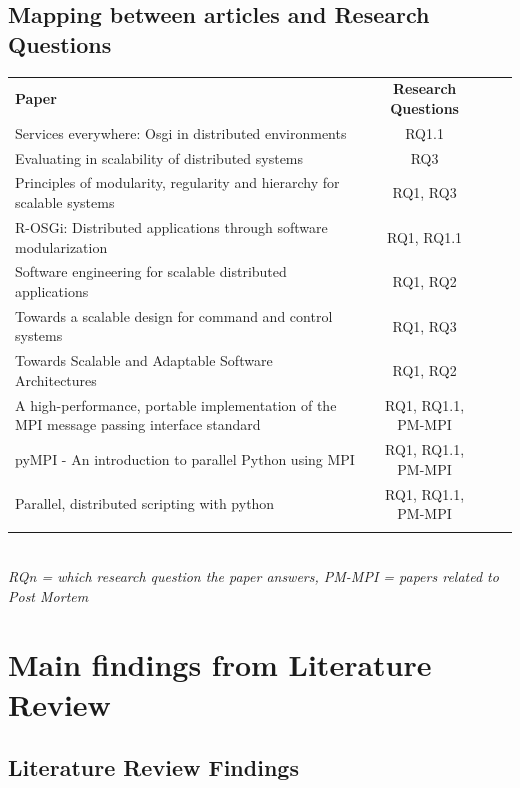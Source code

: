 \documentclass{article}
\begin{document}
{\subsection{Mapping between articles and Research Questions}
\begin{tabular}{p{8cm} c c r}
  \rowcolor[gray]{0.5}
  {\bf Paper} & {\bf Research Questions} \\
  Services everywhere: Osgi in distributed environments & RQ1.1 \\
  Evaluating in scalability of distributed systems & RQ3 \\
  Principles of modularity, regularity and hierarchy for scalable systems & RQ1, RQ3 \\
  R-OSGi: Distributed applications through software modularization & RQ1, RQ1.1 \\
  Software engineering for scalable distributed applications & RQ1, RQ2 \\
  Towards a scalable design for command and control systems & RQ1, RQ3 \\
  Towards Scalable and Adaptable Software Architectures & RQ1, RQ2 \\
  A high-performance, portable implementation of the MPI message passing interface standard & RQ1, RQ1.1, PM-MPI \\
  pyMPI - An introduction to parallel Python using MPI & RQ1, RQ1.1, PM-MPI \\
  Parallel, distributed scripting with python & RQ1, RQ1.1, PM-MPI \\
\rowcolor[gray]{0.5}
\end{tabular}
\\\small \emph{RQ{n} = which research question the paper answers,
 PM-MPI = papers related to Post Mortem }

\section{Main findings from Literature Review}

\subsection{Literature Review Findings}

}
\end{document}
